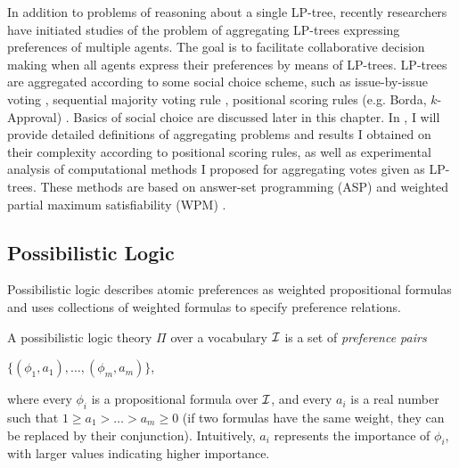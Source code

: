 %
%	  
%	

In addition to problems of reasoning about a single
LP-tree, recently researchers have initiated studies of
the problem of aggregating LP-trees expressing preferences of multiple
agents. The goal is to facilitate collaborative decision making
when all agents express their preferences by means of LP-trees.
LP-trees are aggregated
according to some social choice scheme, such as
issue-by-issue voting \cite{fargier:ibi},
sequential majority voting rule \cite{Xia:SMV},
positional scoring rules (e.g. Borda, $k$-Approval) \cite{lang,LiuT}.
Basics of social choice are discussed later in this chapter.
In , I will provide detailed definitions of aggregating
problems and results I obtained on their complexity 
according to positional scoring rules, as
well as experimental analysis 
of computational methods I proposed for aggregating votes given as
LP-trees.  These methods are based on
answer-set programming (ASP) \cite{aspataglance} and 
weighted partial maximum satisfiability (WPM) \cite{papado:b:compcomplexity}.


\subsection{Possibilistic Logic}
Possibilistic logic \cite{DuboisLP91} describes atomic preferences as weighted propositional
formulas and uses collections of weighted formulas to specify preference
relations.

A possibilistic logic theory $\Pi$ over a vocabulary $\mathcal{I}$ is a set of 
\emph{preference pairs}
\begin{center}
	$\{ (\phi_1,a_1), \ldots, (\phi_m,a_m) \}$,
\end{center}
where every $\phi_i$ is a propositional formula over $\mathcal{I}$, and every $a_i$ is a real number
such that $1\geq a_1>\ldots>a_m\geq 0$ (if two formulas have the same 
weight, they can be replaced by their conjunction).
Intuitively, $a_i$ represents the importance of $\phi_i$, with larger values
indicating higher importance.

